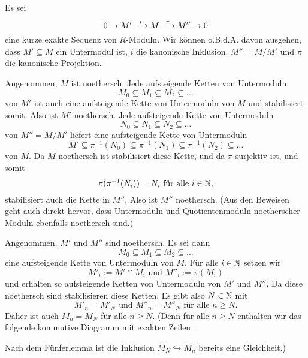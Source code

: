 \documentclass[a4paper,10pt]{article}
\begin{document}
\subsection{}
Es sei
\[
 0 \to M' \xlongrightarrow{i} M \xlongrightarrow{\pi} M'' \to 0
\]
eine kurze exakte Sequenz von $R$-Moduln. Wir können o.B.d.A. davon ausgehen, dass $M' \subseteq M$ ein Untermodul ist, $i$ die kanonische Inklusion, $M'' = M/M'$ und $\pi$ die kanonische Projektion.

Angenommen, $M$ ist noethersch. Jede aufsteigende Ketten von Untermoduln
\[
 M_0 \subseteq M_1 \subseteq M_2 \subseteq \ldots
\]
von $M'$ ist auch eine aufsteigende Kette von Untermoduln von $M$ und stabilisiert somit. Also ist $M'$ noethersch. Jede aufsteigende Kette von Untermoduln
\[
 N_0 \subseteq N_1 \subseteq N_2 \subseteq \ldots
\]
von $M'' = M/M'$ liefert eine aufsteigende Kette von Untermoduln
\[
 M' \subseteq \pi^{-1}(N_0) \subseteq \pi^{-1}(N_1) \subseteq \pi^{-1}(N_2) \subseteq \ldots
\]
von $M$. Da $M$ noethersch ist stabilisiert diese Kette, und da $\pi$ surjektiv ist, und somit
\[
 \pi(\pi^{-1}(N_i)) = N_i \text{ für alle } i \in \mathbb{N},
\]
stabilisiert auch die Kette in $M''$. Also ist $M''$ noethersch. (Aus den Beweisen geht auch direkt hervor, dass Untermoduln und Quotientenmoduln noetherscher Moduln ebenfalls noethersch sind.)

Angenommen, $M'$ und $M''$ sind noethersch. Es sei dann
\[
 M_0 \subseteq M_1 \subseteq M_2 \subseteq \ldots
\]
eine aufsteigende Kette von Untermoduln von $M$. Für alle $i \in \mathbb{N}$ setzen wir
\[
 M'_i := M' \cap M_i \text{ und } M''_i := \pi(M_i)
\]
und erhalten so aufsteigende Ketten von Untermoduln von $M'$ und $M''$. Da diese noethersch sind stabilisieren diese Ketten. Es gibt also $N \in \mathbb{N}$ mit
\[
 M'_n = M'_N \text{ und } M''_n = M''_N \text{ für alle } n \geq N.
\]
Daher ist auch $M_n = M_N$ für alle $n \geq N$. (Denn für alle $n \geq N$ enthalten wir das folgende kommutive Diagramm mit exakten Zeilen.
\begin{center}
\end{center}
Nach dem Fünferlemma ist die Inklusion $M_N \hookrightarrow M_n$ bereits eine Gleichheit.)
\end{document}
